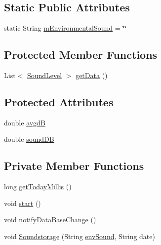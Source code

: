 \subsection*{Static Public Attributes}
\begin{DoxyCompactItemize}
\item 
static String \hyperlink{classcs_1_1nsense_1_1microphone_1_1_microphone_pipeline_a95dbdadaa744d09652abf51d9347af9d}{m\-Environmental\-Sound} = \char`\"{}\char`\"{}
\end{DoxyCompactItemize}
\subsection*{Protected Member Functions}
\begin{DoxyCompactItemize}
\item 
List$<$ \hyperlink{classcs_1_1nsense_1_1microphone_1_1_sound_level}{Sound\-Level} $>$ \hyperlink{classcs_1_1nsense_1_1microphone_1_1_microphone_pipeline_af6184b2952e8aa482ac8a15f829843d3}{get\-Data} ()
\end{DoxyCompactItemize}
\subsection*{Protected Attributes}
\begin{DoxyCompactItemize}
\item 
double \hyperlink{classcs_1_1nsense_1_1microphone_1_1_microphone_pipeline_a26ed15d758ad9baf9818b32da84c2983}{avgd\-B}
\item 
double \hyperlink{classcs_1_1nsense_1_1microphone_1_1_microphone_pipeline_a925023c3a2910aaf80f77ed11ba60bfa}{sound\-D\-B}
\end{DoxyCompactItemize}
\subsection*{Private Member Functions}
\begin{DoxyCompactItemize}
\item 
long \hyperlink{classcs_1_1nsense_1_1microphone_1_1_microphone_pipeline_a7ac9d6a6a6a640b42e44f625c778b8ac}{get\-Today\-Millis} ()
\item 
void \hyperlink{classcs_1_1nsense_1_1microphone_1_1_microphone_pipeline_a11aaba65afc7a8e67281417ee951726b}{start} ()
\item 
void \hyperlink{classcs_1_1nsense_1_1microphone_1_1_microphone_pipeline_ae3b5d86b47e0da31c3f5ccb06b582c1e}{notify\-Data\-Base\-Change} ()
\item 
void \hyperlink{classcs_1_1nsense_1_1microphone_1_1_microphone_pipeline_a0474c673c1c9abf1ca758f30141d7617}{Soundstorage} (String \hyperlink{classcs_1_1nsense_1_1microphone_1_1_microphone_pipeline_adc2543723923db8f92bce32562db8439}{env\-Sound}, String date)
\end{DoxyCompactItemize}
